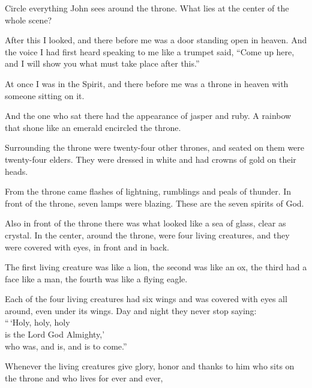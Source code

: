 \begin{ScriptureBox2}{Circle everything John sees around the throne. 
What lies at the center of the whole scene?}

\item[4:1] After this I looked, and there before me was a door standing open in heaven. And the voice I had first heard speaking to me like a trumpet said, ``Come up here, and I will show you what must take place after this.''

\item[4:2] At once I was in the Spirit, and there before me was a throne in heaven with someone sitting on it.

\item[4:3] And the one who sat there had the appearance of jasper and ruby. A rainbow that shone like an emerald encircled the throne.

\item[4:4] Surrounding the throne were twenty-four other thrones, and seated on them were twenty-four elders. They were dressed in white and had crowns of gold on their heads.

\item[4:5] From the throne came flashes of lightning, rumblings and peals of thunder. In front of the throne, seven lamps were blazing. These are the seven spirits of God.

\item[4:6] Also in front of the throne there was what looked like a sea of glass, clear as crystal. In the center, around the throne, were four living creatures, and they were covered with eyes, in front and in back.

\item[4:7] The first living creature was like a lion, the second was like an ox, the third had a face like a man, the fourth was like a flying eagle.

\item[4:8] Each of the four living creatures had six wings and was covered with eyes all around, even under its wings. Day and night they never stop saying:\\
\hspace*{1.5em}``\,`Holy, holy, holy\\
\hspace*{1.5em}is the Lord God Almighty,'\\
\hspace*{1.5em}who was, and is, and is to come.''

\item[4:9] Whenever the living creatures give glory, honor and thanks to him who sits on the throne and who lives for ever and ever,

\end{ScriptureBox2}



